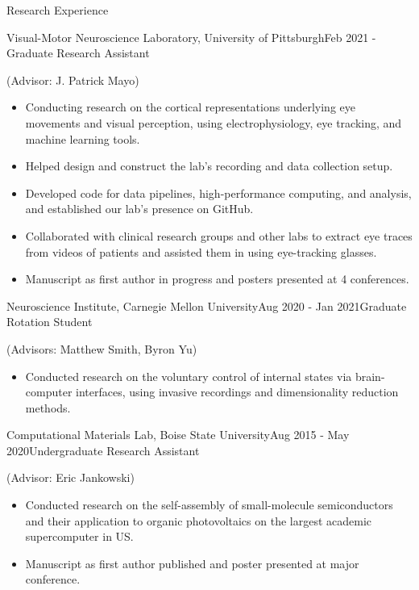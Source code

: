 \documentclass{resume} %
\begin{document}
\begin{rSection}{Research Experience}

\begin{rSubsection}{Visual-Motor Neuroscience Laboratory, University of Pittsburgh}{Feb 2021 -}{Graduate Research Assistant}{}
\item (Advisor: J. Patrick Mayo)
\begin{itemize}
    \item Conducting research on the cortical representations underlying eye movements and visual perception, using electrophysiology, eye tracking, and machine learning tools. 
    \item Helped design and construct the lab's recording and data collection setup.
    \item Developed code for data pipelines, high-performance computing, and analysis, and established our lab's presence on GitHub.
    \item Collaborated with clinical research groups and other labs to extract eye traces from videos of patients and assisted them in using eye-tracking glasses.
    \item Manuscript as first author in progress and posters presented at 4 conferences. 
\end{itemize}
\end{rSubsection}


\begin{rSubsection}{Neuroscience Institute, Carnegie Mellon University}{Aug 2020 - Jan 2021}{Graduate Rotation Student}{}
\item (Advisors: Matthew Smith, Byron Yu)
\begin{itemize}
    \item Conducted research on the voluntary control of internal states via brain-computer interfaces, using invasive recordings and dimensionality reduction methods.
\end{itemize}
\end{rSubsection}


\begin{rSubsection}{Computational Materials Lab, Boise State University}{Aug 2015 - May 2020}{Undergraduate Research Assistant}{}
\item (Advisor: Eric Jankowski)
\begin{itemize}
    \item Conducted research on the self-assembly of small-molecule semiconductors and their application to organic photovoltaics on the largest academic supercomputer in US.
    \item Manuscript as first author published and poster presented at major conference. 
\end{itemize}
\end{rSubsection}


\end{rSection}
\end{document}

